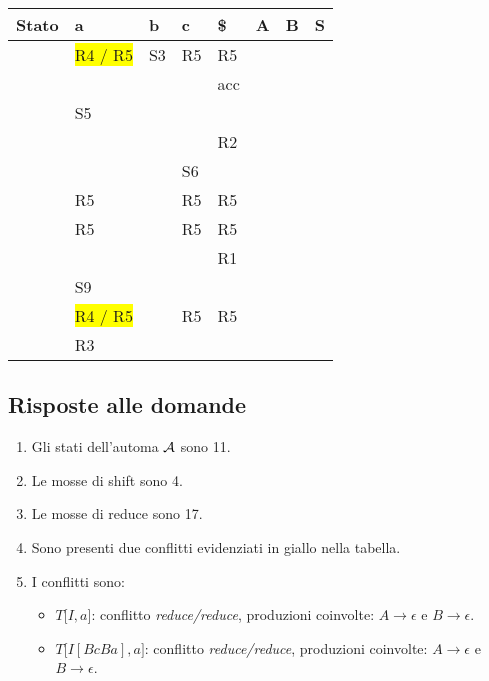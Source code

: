 \documentclass[11pt]{article}
\begin{document}
\begin{table}[H]
  \centering
  \begin{tabularx}{\textwidth}{|>{\centering\arraybackslash}X|>{\centering\arraybackslash}X|>{\centering\arraybackslash}X|>{\centering\arraybackslash}X|>{\centering\arraybackslash}X|>{\centering\arraybackslash}X|>{\centering\arraybackslash}X|>{\centering\arraybackslash}X|}
  \hline
  \textbf{Stato} & \textbf{a} & \textbf{b} & \textbf{c} & \textbf{\$} & \textbf{A} & \textbf{B} & \textbf{S} \\
  \hline
  0 & \colorbox{yellow}{R4 / R5} & S3 & R5 & R5 & 2 & 4 & 1 \\
  \hline
  1 &  &  &  & acc &  &  & \\
  \hline
  2 & S5 &  &  &  &  &  & \\
  \hline
  3 &  &  &  & R2 &  &  &  \\
  \hline
  4 &  &  & S6 &  &  &  & \\
  \hline
  5 & R5 &  & R5 & R5 &  & 7 & \\
  \hline
  6 & R5 &  & R5 & R5 &  & 8 & \\
  \hline
  7 &  &  &  & R1 &  &  & \\
  \hline
  8 & S9 &  &  &  &  &  & \\
  \hline
  9 & \colorbox{yellow}{R4 / R5} &  & R5 & R5 & 10 & 4 & \\
  \hline
  10 & R3 &  &  &  &  &  & \\
  \hline
  \end{tabularx}
  \label{tab:01-parsing-table}
\end{table}

\subsection{Risposte alle domande}

\begin{enumerate}
  \item Gli stati dell'automa $\cal A$ sono 11.
  \item Le mosse di shift sono 4.
  \item Le mosse di reduce sono 17.
  \item Sono presenti due conflitti evidenziati in giallo nella tabella.
  \item I conflitti sono:
  \begin{itemize}
    \item $T\big[I, a\big]$: conflitto \textit{reduce/reduce}, produzioni coinvolte: $A\rightarrow \epsilon$ e $B\rightarrow \epsilon$.
    \item $T\big[I[BcBa], a\big]$: conflitto \textit{reduce/reduce}, produzioni coinvolte: $A\rightarrow \epsilon$ e $B\rightarrow \epsilon$.
  \end{itemize}
\end{enumerate}
\end{document}
